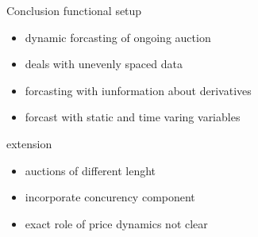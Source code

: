 \documentclass[hyperref={pdfpagelabels=false}]{beamer}
\begin{document}
\begin{frame}{Conclusion}
functional setup
\begin{itemize}
\item dynamic forcasting of ongoing auction
\item deals with unevenly spaced data
\item forcasting with iunformation about derivatives
\item forcast with static and time varing variables
\end{itemize}

extension
\begin{itemize}
\item auctions of different lenght
\item incorporate concurency component
\item exact role of price dynamics not clear
\end{itemize}
\end{frame}
\end{document}

